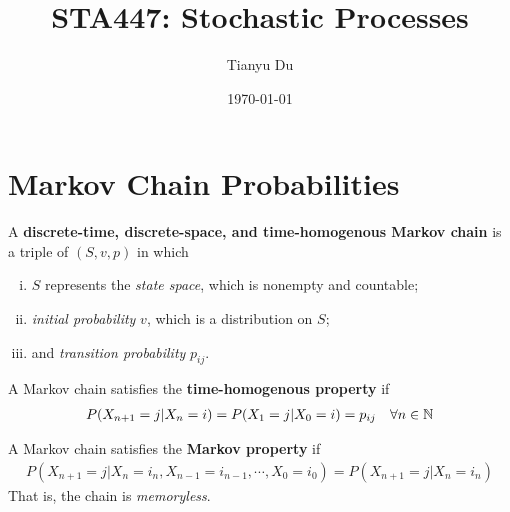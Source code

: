 \documentclass{article}
\title{STA447: Stochastic Processes}
\date{\today}
\author{Tianyu Du}
\begin{document}
    \maketitle
    \tableofcontents
    \newpage
    \section{Markov Chain Probabilities}
    
    \begin{definition}
    	A \textbf{discrete-time, discrete-space, and time-homogenous Markov chain} is a triple of $(S, v, p)$ in which
    	\begin{enumerate}[(i)]
    		\item $S$ represents the \emph{state space}, which is nonempty and countable;
    		\item \emph{initial probability} $v$, which is a distribution on $S$;
    		\item and \emph{transition probability} $p_{ij}$.
    	\end{enumerate}
    \end{definition}
    
    \begin{definition}
    	A Markov chain satisfies the \textbf{time-homogenous property} if
    	\begin{align}
    		P(X_{n+1}=j|X_n=i) = P(X_1=j|X_0=i) = p_{ij}\quad \forall n \in \mathbb{N}
    	\end{align}
    \end{definition}
    
    \begin{definition}
    	A Markov chain satisfies the \textbf{Markov property} if
    	\begin{align}
    		P(X_{n+1}=j|X_n=i_n, X_{n-1}=i_{n-1}, \cdots, X_0=i_0) = P(X_{n+1}=j|X_n=i_n)
    	\end{align}
    	That is, the chain is \emph{memoryless}.
    \end{definition}
    
\end{document}
